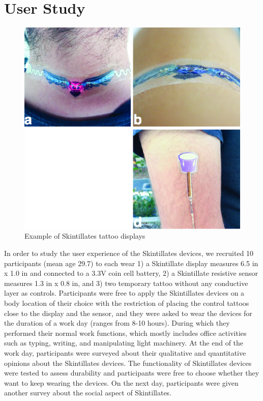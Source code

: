 \documentclass{sigchi}
\begin{document}
\section {User Study}
\begin{figure}
\centering
\includegraphics[width=1\columnwidth]{figures/Figure11}
\caption{Example of Skintillates tattoo displays}
\vspace{-8pt}
\label{fig:userstudy}
\end{figure}
In order to study the user experience of the Skintillates devices, we recruited 10 participants (mean age 29.7) to each wear 1) a Skintillate display measures 6.5 in x 1.0 in and connected to a 3.3V coin cell battery, 2) a Skintillate resistive sensor measures 1.3 in x 0.8 in, and 3) two temporary tattoo without any conductive layer as controls. Participants were free to apply the Skintillates devices on a body location of their choice with the restriction of placing the control tattoos close to the display and the sensor,  and they were asked to wear the devices for the duration of a work day (ranges from 8-10 hours). During which they performed their normal work functions, which mostly includes office activities such as typing, writing, and manipulating light machinery. At the end of the work day, participants were surveyed about their qualitative and quantitative opinions about the Skintillates devices. The functionality of Skintillates devices were tested to assess durability and participants were free to choose whether they want to keep wearing the devices. On the next day, participants were given another survey about the social aspect of Skintillates.
\end{document}
